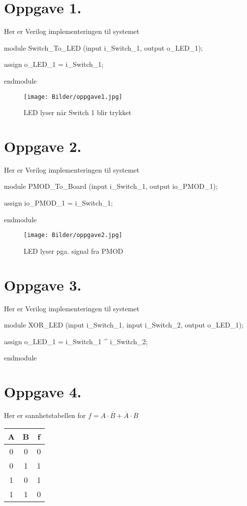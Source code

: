 \documentclass[a4paper,11pt,norsk]{article}
\begin{document}


\section*{Oppgave 1.}
Her er Verilog implementeringen til systemet
\begin{verilogcode}
module Switch_To_LED
    (input i_Switch_1,
     output o_LED_1);

 assign o_LED_1 = i_Switch_1;

endmodule
\end{verilogcode}

\begin{figure}[H]
    \centering
    \texttt{[image: Bilder/oppgave1.jpg]}
    \caption{LED lyser når Switch 1 blir trykket}
\end{figure}

\section*{Oppgave 2.}
Her er Verilog implementeringen til systemet
\begin{verilogcode}
module PMOD_To_Board
    (input i_Switch_1,
    output io_PMOD_1);

 assign io_PMOD_1 = i_Switch_1;

endmodule
\end{verilogcode}
\begin{figure}[H]
    \centering
    \texttt{[image: Bilder/oppgave2.jpg]}
    \caption{LED lyser pga. signal fra PMOD}
\end{figure}

\newpage
\section*{Oppgave 3.}
Her er Verilog implementeringen til systemet
\begin{verilogcode}
module XOR_LED
    (input i_Switch_1,
     input i_Switch_2,
     output o_LED_1);

 assign o_LED_1 = i_Switch_1 ^ i_Switch_2;

endmodule
\end{verilogcode}

\section*{Oppgave 4.}
Her er sannhetstabellen for $f = A \cdot \overline{B} + \overline{A} \cdot B$
\begin{center}
    \begin{tabular}{|| c | c | c ||} 
        \hline
        A & B & f \\ [0.5ex] 
        \hline\hline
        0 & 0 & 0 \\ 
        \hline
        0 & 1 & 1 \\
        \hline
        1 & 0 & 1 \\
        \hline
        1 & 1 & 0 \\
        \hline
    \end{tabular}
\end{center}
\end{document}
